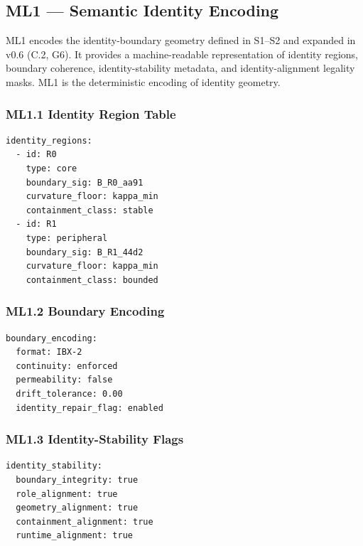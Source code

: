 
\subsection*{ML1 — Semantic Identity Encoding}

ML1 encodes the identity-boundary geometry defined in S1–S2 and expanded in
v0.6 (C.2, G6). It provides a machine-readable representation of identity
regions, boundary coherence, identity-stability metadata, and identity-alignment
legality masks. ML1 is the deterministic encoding of identity geometry.

\subsubsection*{ML1.1 Identity Region Table}

\begin{verbatim}
identity_regions:
  - id: R0
    type: core
    boundary_sig: B_R0_aa91
    curvature_floor: kappa_min
    containment_class: stable
  - id: R1
    type: peripheral
    boundary_sig: B_R1_44d2
    curvature_floor: kappa_min
    containment_class: bounded
\end{verbatim}

\subsubsection*{ML1.2 Boundary Encoding}

\begin{verbatim}
boundary_encoding:
  format: IBX-2
  continuity: enforced
  permeability: false
  drift_tolerance: 0.00
  identity_repair_flag: enabled
\end{verbatim}

\subsubsection*{ML1.3 Identity-Stability Flags}

\begin{verbatim}
identity_stability:
  boundary_integrity: true
  role_alignment: true
  geometry_alignment: true
  containment_alignment: true
  runtime_alignment: true
\end{verbatim}

